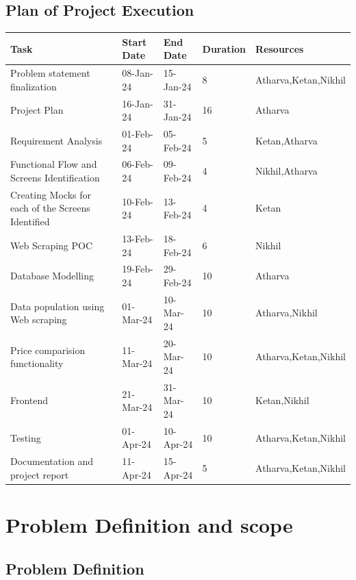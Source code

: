 \documentclass[a4paper,14pt,onecolumn]{report}
\begin{document}
	\section{Plan of Project Execution}
	\begin{left}
		\begin{tabular}{p{4cm} | p{2cm} | p{2cm} | p{1.5cm} | p{1cm}} 
			Task & Start Date & End Date & Duration & Resources \\ [0.5ex] 
			\hline
			
			Problem statement finalization & 08-Jan-24 & 15-Jan-24 & 8 & Atharva,Ketan,Nikhil
			\\ 
			\hline
			Project Plan & 16-Jan-24 & 31-Jan-24 & 16 & Atharva 
			\\
			\hline
			Requirement Analysis & 01-Feb-24 & 05-Feb-24 & 5 & Ketan,Atharva \\
			\hline
			Functional Flow and Screens Identification & 06-Feb-24 & 09-Feb-24 & 4 & Nikhil,Atharva
			\\
			\hline
			Creating Mocks for each of the Screens Identified & 10-Feb-24 & 13-Feb-24 & 4 & Ketan
			\\
			\hline
			Web Scraping POC & 13-Feb-24 & 18-Feb-24 & 6 & Nikhil
			\\
			\hline
			Database Modelling & 19-Feb-24 & 29-Feb-24 & 10 & Atharva
			\\
			\hline
			Data population using Web scraping & 01-Mar-24 & 10-Mar-24 & 10 & Atharva,Nikhil
			\\
			\hline
			Price comparision functionality & 11-Mar-24 & 20-Mar-24 & 10 & Atharva,Ketan,Nikhil
			\\
			\hline
			Frontend & 21-Mar-24 & 31-Mar-24 & 10 & Ketan,Nikhil
			\\
			\hline
			Testing & 01-Apr-24 & 10-Apr-24 & 10 & Atharva,Ketan,Nikhil
			\\
			\hline
			Documentation and project report & 11-Apr-24 & 15-Apr-24 & 5 & Atharva,Ketan,Nikhil\\[1ex] 
			\hline
		\end{tabular}
	\end{left}
	
	
	\chapter{Problem Definition and scope}
	\section{Problem Definition}
\end{document}
